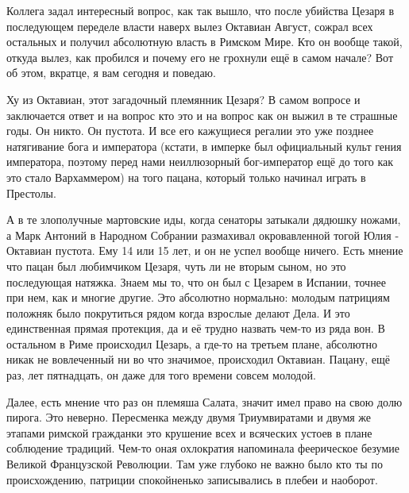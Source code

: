 Коллега задал интересный вопрос, как так вышло, что после убийства Цезаря в последующем переделе власти наверх вылез Октавиан Август, сожрал всех остальных и получил абсолютную власть в Римском Мире. Кто он вообще такой, откуда вылез, как пробился и почему его не грохнули ещё в самом начале? Вот об этом, вкратце, я вам сегодня и поведаю.


Ху из Октавиан, этот загадочный племянник Цезаря? В самом вопросе и заключается ответ и на вопрос кто это и на вопрос как он выжил в те страшные годы. Он никто. Он пустота. И все его кажущиеся регалии это уже позднее натягивание бога и императора (кстати, в имперке был официальный культ гения императора, поэтому перед нами неиллюзорный бог-император ещё до того как это стало Вархаммером) на того пацана, который только начинал играть в Престолы.

А в те злополучные мартовские иды, когда сенаторы затыкали дядюшку ножами, а Марк Антоний в Народном Собрании размахивал окровавленной тогой Юлия - Октавиан пустота. Ему 14 или 15 лет, и он не успел вообще ничего. Есть мнение что пацан был любимчиком Цезаря, чуть ли не вторым сыном, но это последующая натяжка. Знаем мы то, что он был с Цезарем в Испании, точнее при нем, как и многие другие. Это абсолютно нормально: молодым патрициям положняк было покрутиться рядом когда взрослые делают Дела. И это единственная прямая протекция, да и её трудно назвать чем-то из ряда вон. В остальном в Риме происходил Цезарь, а где-то на третьем плане, абсолютно никак не вовлеченный ни во что значимое, происходил Октавиан. Пацану, ещё раз, лет пятнадцать, он даже для того времени совсем молодой.


Далее, есть мнение что раз он племяша Салата, значит имел право на свою долю пирога. Это неверно. Пересменка между двумя Триумвиратами и двумя же этапами римской гражданки это крушение всех и всяческих устоев в плане соблюдение традиций. Чем-то оная охлократия напоминала феерическое безумие Великой Французской Революции. Там уже глубоко не важно было кто ты по происхождению, патриции спокойненько записывались в плебеи и наоборот.

